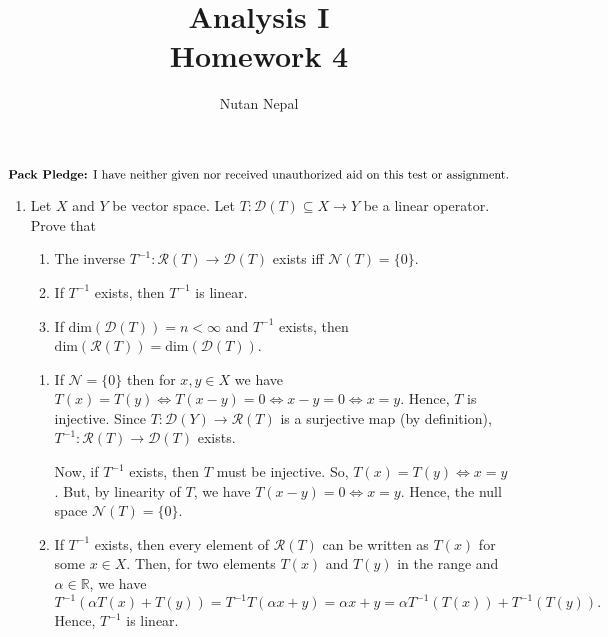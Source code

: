 \documentclass[12pt]{article}
\title{Analysis I \\
\large Homework 4
}
\author{Nutan Nepal}
\newcommand{\rl}{\mathbb{R}}
\newcommand{\cD}{\mathcal{D}}
\newcommand{\cR}{\mathcal{R}}
\newcommand{\cN}{\mathcal{N}}
\newcommand{\packpledge}{
    $\text{{\bf Pack Pledge:} I have neither given nor
    received unauthorized aid on this
    test or assignment.}$}
\begin{document}
\maketitle
\packpledge\\
\makebox[\linewidth]{\rule{200mm}{1pt}}
\vspace{1mm}

\begin{enumerate}

\item Let $X$ and $Y$ be vector space.
    Let $T: \cD(T) \subseteq X
    \to Y$ be a linear operator. Prove that 
    \begin{enumerate}
    \item The inverse $T^{-1}: \cR(T) \to \cD(T)$ exists
    iff $\cN(T) = \{0\}$. 
    \item If $T^{-1}$ exists, then $T^{-1}$ is linear. 
    \item If $\text{dim}(\cD(T)) = n < \infty$ and $T^{-1}$
    exists, then $\text{dim}(\cR(T)) =\text{dim}(\cD(T))$. 
    \end{enumerate}

\begin{mybox}

    \begin{enumerate}
        \item If $\cN=\{0\}$ then for $x,y\in X$ we have
            $T(x)=T(y)\iff T(x-y)=0\iff x-y=0\iff x=y$.
            Hence, $T$ is injective. Since
            $T:\cD(Y)\to\cR(T)$ is a surjective map
            (by definition), $T^{-1}:\cR(T)\to\cD(T)$
            exists.

            \vspace*{1mm}
            Now, if $T^{-1}$ exists, then $T$ must be
            injective. So, $T(x)=T(y)\iff x=y$. But, by
            linearity of $T$, we have $T(x-y)=0\iff x=y$.
            Hence, the null space $\cN(T)=\{0\}$.

        \vspace*{3mm}
        \item If $T^{-1}$ exists, then every element of
            $\cR(T)$ can be written as $T(x)$ for some $x\in
            X$. Then, for two elements $T(x)$ and $T(y)$ in
            the range and $\alpha\in\rl$, we have
            $$T^{-1}(\alpha T(x)+T(y))=T^{-1}T(\alpha x+y)
            =\alpha x+y=\alpha T^{-1}(T(x))
            +T^{-1}(T(y)).$$
            Hence, $T^{-1}$ is linear.
        

\end{enumerate}
\end{mybox}
\end{enumerate}
\end{document}
